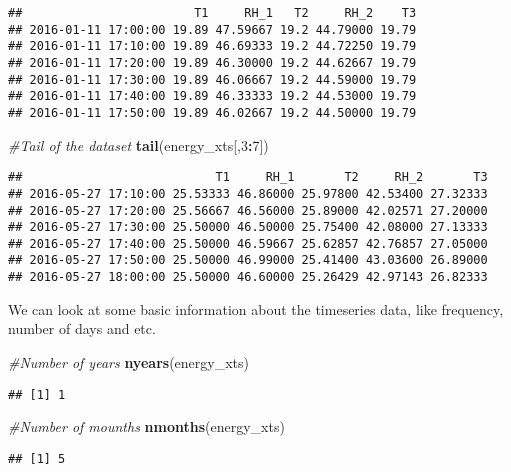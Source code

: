 \documentclass[]{article}
\newenvironment{Shaded}{\begin{snugshade}}{\end{snugshade}}
\newcommand{\KeywordTok}[1]{\textcolor[rgb]{0.13,0.29,0.53}{\textbf{#1}}}
\newcommand{\DecValTok}[1]{\textcolor[rgb]{0.00,0.00,0.81}{#1}}
\newcommand{\CommentTok}[1]{\textcolor[rgb]{0.56,0.35,0.01}{\textit{#1}}}
\newcommand{\OperatorTok}[1]{\textcolor[rgb]{0.81,0.36,0.00}{\textbf{#1}}}
\newcommand{\NormalTok}[1]{#1}
\begin{document}
\begin{verbatim}
##                        T1     RH_1   T2     RH_2    T3
## 2016-01-11 17:00:00 19.89 47.59667 19.2 44.79000 19.79
## 2016-01-11 17:10:00 19.89 46.69333 19.2 44.72250 19.79
## 2016-01-11 17:20:00 19.89 46.30000 19.2 44.62667 19.79
## 2016-01-11 17:30:00 19.89 46.06667 19.2 44.59000 19.79
## 2016-01-11 17:40:00 19.89 46.33333 19.2 44.53000 19.79
## 2016-01-11 17:50:00 19.89 46.02667 19.2 44.50000 19.79
\end{verbatim}

\begin{Shaded}
\begin{Highlighting}[]
\CommentTok{#Tail of the dataset}
\KeywordTok{tail}\NormalTok{(energy_xts[,}\DecValTok{3}\OperatorTok{:}\DecValTok{7}\NormalTok{])}
\end{Highlighting}
\end{Shaded}

\begin{verbatim}
##                           T1     RH_1       T2     RH_2       T3
## 2016-05-27 17:10:00 25.53333 46.86000 25.97800 42.53400 27.32333
## 2016-05-27 17:20:00 25.56667 46.56000 25.89000 42.02571 27.20000
## 2016-05-27 17:30:00 25.50000 46.50000 25.75400 42.08000 27.13333
## 2016-05-27 17:40:00 25.50000 46.59667 25.62857 42.76857 27.05000
## 2016-05-27 17:50:00 25.50000 46.99000 25.41400 43.03600 26.89000
## 2016-05-27 18:00:00 25.50000 46.60000 25.26429 42.97143 26.82333
\end{verbatim}

We can look at some basic information about the timeseries data, like
frequency, number of days and etc.

\begin{Shaded}
\begin{Highlighting}[]
\CommentTok{#Number of years}
\KeywordTok{nyears}\NormalTok{(energy_xts)}
\end{Highlighting}
\end{Shaded}

\begin{verbatim}
## [1] 1
\end{verbatim}

\begin{Shaded}
\begin{Highlighting}[]
\CommentTok{#Number of mounths}
\KeywordTok{nmonths}\NormalTok{(energy_xts)}
\end{Highlighting}
\end{Shaded}

\begin{verbatim}
## [1] 5
\end{verbatim}
\end{document}
